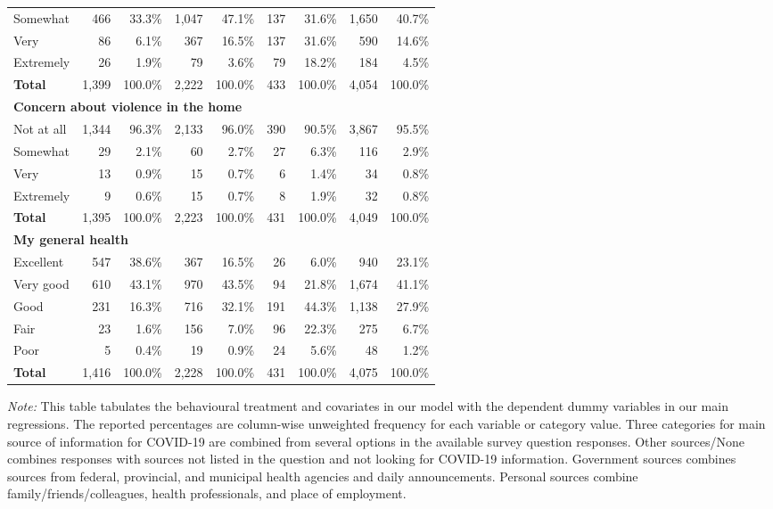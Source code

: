 \documentclass{article}[12pt]
\begin{document}
\begin{table}[!t]
\begin{threeparttable}
\begin{tabular}{lrrrrrrrr}
                Somewhat&466&33.3\%&1,047&47.1\%&137&31.6\%&1,650&40.7\% \\
                Very&86&6.1\%&367&16.5\%&137&31.6\%&590&14.6\% \\
                Extremely&26&1.9\%&79&3.6\%&79&18.2\%&184&4.5\% \\
                \textbf{Total}&1,399&100.0\%&2,222&100.0\%&433&100.0\%&4,054&100.0\% \\
                \hline
                \multicolumn{8}{l}{\bf Concern about violence in the home} \\
                Not at all&1,344&96.3\%&2,133&96.0\%&390&90.5\%&3,867&95.5\% \\
                Somewhat&29&2.1\%&60&2.7\%&27&6.3\%&116&2.9\% \\
                Very&13&0.9\%&15&0.7\%&6&1.4\%&34&0.8\% \\
                Extremely&9&0.6\%&15&0.7\%&8&1.9\%&32&0.8\% \\
                \textbf{Total}&1,395&100.0\%&2,223&100.0\%&431&100.0\%&4,049&100.0\% \\
                \hline
                \multicolumn{8}{l}{\bf My general health} \\
                Excellent&547&38.6\%&367&16.5\%&26&6.0\%&940&23.1\% \\
                Very good&610&43.1\%&970&43.5\%&94&21.8\%&1,674&41.1\% \\
                Good&231&16.3\%&716&32.1\%&191&44.3\%&1,138&27.9\% \\
                Fair&23&1.6\%&156&7.0\%&96&22.3\%&275&6.7\% \\
                Poor&5&0.4\%&19&0.9\%&24&5.6\%&48&1.2\% \\
                \textbf{Total}&1,416&100.0\%&2,228&100.0\%&431&100.0\%&4,075&100.0\% \\
                \hline
            \end{tabular}
            \begin{tablenotes}
                \item
                \textit{Note:} This table tabulates the behavioural treatment and covariates in our model with the dependent dummy variables in our main regressions. The reported percentages are column-wise unweighted frequency for each variable or category value. Three categories for main source of information for COVID-19 are combined from several options in the available survey question responses. Other sources/None combines responses with sources not listed in the question and not looking for COVID-19 information. Government sources combines sources from federal, provincial, and municipal health agencies and daily announcements. Personal sources combine family/friends/colleagues, health professionals, and place of employment.
            \end{tablenotes}
            
            \label{tab:behav2}
        \end{threeparttable}
        \end{table}
        
\end{document}
